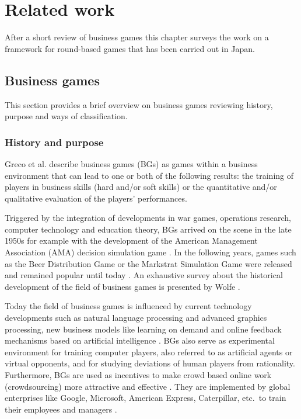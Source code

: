 \chapter{Related work}
\label{cha:related}

After a short review of business games this chapter surveys the work on a framework for round-based games that has been carried out in Japan.

\section{Business games}
\label{sec:bg}

This section provides a brief overview on business games reviewing history, purpose and ways of classification.

\subsection{History and purpose}
\label{subsec:history}

Greco et al. \cite{greco} describe business games (BGs) as games within a business environment that can lead to one or both of the following results: the training of players in business skills (hard and/or soft skills) or the quantitative and/or qualitative evaluation of the players' performances.

Triggered by the integration of developments in war games, operations research, computer technology and education theory, BGs arrived on the scene in the late 1950s for example with the development of the American Management Association (AMA) decision simulation game \cite{ricciardi}.
In the following years, games such as the Beer Distribution Game \cite{beergame,jarmain,JForrester1961} or the Markstrat Simulation Game \cite{JLarreche1977} were released and remained popular until today \cite{stratx}.
An exhaustive survey about the historical development of the field of business games is presented by Wolfe \cite{wolfe93}.

Today the field of business games is influenced by current technology developments such as natural language processing and advanced graphics processing, new business models like learning on demand and online feedback mechanisms based on artificial intelligence \cite{summers}. 
BGs also serve as experimental environment for training computer players, also referred to as artificial agents or virtual opponents, and for studying deviations of human players from rationality.
Furthermore, BGs are used as incentives to make crowd based online work (crowdsourcing) more attractive and effective \cite{rokicki_competitive_2014}.
They are implemented by global enterprises like Google, Microsoft, American Express, Caterpillar, etc.\ to train their employees and managers \cite{uskov_serious_2014}.

